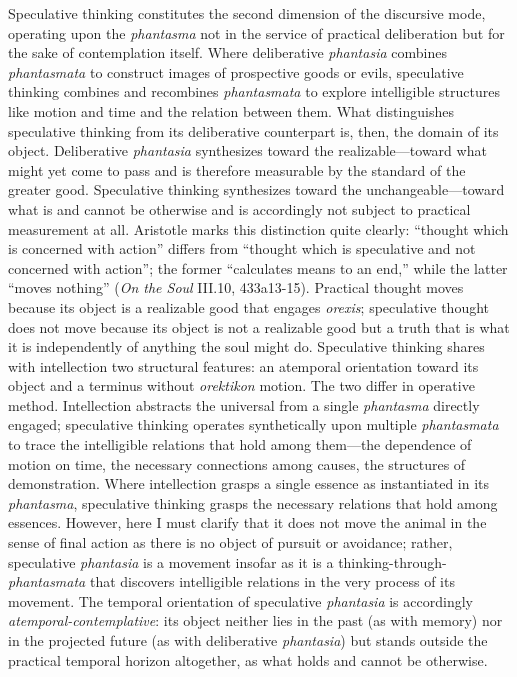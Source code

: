 \documentclass{article}
\begin{document}
Speculative thinking constitutes the second dimension of the discursive mode, operating upon the \textit{phantasma} not in the service of practical deliberation but for the sake of contemplation itself. Where deliberative \textit{phantasia} combines \textit{phantasmata} to construct images of prospective goods or evils, speculative thinking combines and recombines \textit{phantasmata} to explore intelligible structures like motion and time and the relation between them. What distinguishes speculative thinking from its deliberative counterpart is, then, the domain of its object. Deliberative \textit{phantasia} synthesizes toward the realizable---toward what might yet come to pass and is therefore measurable by the standard of the greater good. Speculative thinking synthesizes toward the unchangeable---toward what is and cannot be otherwise and is accordingly not subject to practical measurement at all. Aristotle marks this distinction quite clearly: ``thought which is concerned with action'' differs from ``thought which is speculative and not concerned with action''; the former ``calculates means to an end,'' while the latter ``moves nothing'' (\textit{On the Soul} III.10, 433a13-15).  Practical thought moves because its object is a realizable good that engages \textit{orexis}; speculative thought does not move because its object is not a realizable good but a truth that is what it is independently of anything the soul might do. Speculative thinking shares with intellection two structural features: an atemporal orientation toward its object and a terminus without \textit{orektikon} motion. The two differ in operative method. Intellection abstracts the universal from a single \textit{phantasma} directly engaged; speculative thinking operates synthetically upon multiple \textit{phantasmata} to trace the intelligible relations that hold among them---the dependence of motion on time, the necessary connections among causes, the structures of demonstration. Where intellection grasps a single essence as instantiated in its \textit{phantasma}, speculative thinking grasps the necessary relations that hold among essences. However, here I must clarify that it does not move the animal in the sense of final action as there is no object of pursuit or avoidance; rather, speculative \textit{phantasia} is a movement insofar as it is a thinking-through-\textit{phantasmata} that discovers intelligible relations in the very process of its movement. The temporal orientation of speculative \textit{phantasia} is accordingly \textit{atemporal-contemplative}: its object neither lies in the past (as with memory) nor in the projected future (as with deliberative \textit{phantasia}) but stands outside the practical temporal horizon altogether, as what holds and cannot be otherwise. 
\end{document}
